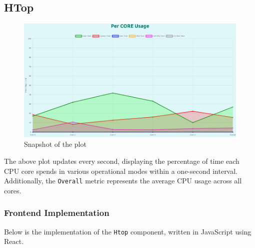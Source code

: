 \documentclass[12pt]{article}
\begin{document}
\subsection{HTop}
\begin{figure}[H]
    \centering
    \begin{minipage}{0.8\textwidth}
        \centering
        \includegraphics[width=\textwidth]{logos and images/htop_1.png}
    \end{minipage}
    \hfill
    
    \caption{Snapshot of the plot}
\end{figure}
The above plot updates every second, displaying the percentage of time each CPU core spends in various operational modes within a one-second interval. Additionally, the \texttt{Overall} metric represents the average CPU usage across all cores.
\subsubsection{Frontend Implementation}

Below is the implementation of the \texttt{Htop} component, written in JavaScript using React. 
\end{document}
